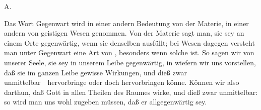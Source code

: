 A.~
\begin{aufza}
\item Das Wort Gegenwart wird in einer andern Bedeutung von der Materie, in einer andern von geistigen Wesen genommen. Von der Materie sagt man, sie sey an einem Orte gegenwärtig, wenn sie denselben ausfüllt; bei  Wesen dagegen versteht man unter Gegenwart eine Art von , besonders wenn solche  ist. So sagen wir von unserer Seele, sie sey in unserem Leibe gegenwärtig, in wiefern wir uns vorstellen, daß sie im ganzen Leibe gewisse Wirkungen, und dieß zwar unmittelbar~\ hervorbringe oder doch hervorbringen könne. Können wir also darthun, daß Gott in allen Theilen des Raumes wirke, und dieß zwar unmittelbar: so wird man uns wohl zugeben müssen, daß er allgegenwärtig sey.

\end{aufza}

